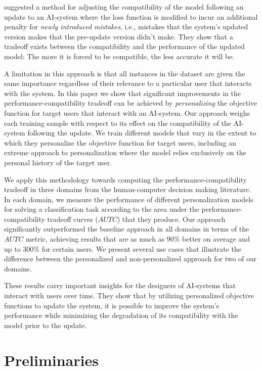 \documentclass[letterpaper]{article} %
\theoremstyle{definition}
\begin{document}
\citet{bansal2019updates} suggested a method for adjusting the compatibility of the model following an update to an AI-system  where the loss function is modified to incur an additional penalty for \textit{newly introduced mistakes}, i.e., mistakes that the system's updated version makes that the pre-update version didn't make. They show that a tradeoff exists between the compatibility and the performance of the updated model: The more it is forced to be compatible, the less accurate it will be.

A limitation in this approach is that all instances in the dataset are given the same importance regardless of their relevance to a particular user that interacts with the system.
In this paper we show that significant improvements in the performance-compatibility tradeoff can be achieved by \emph{personalizing} the objective function for   target users that interact with an AI-system. Our approach
weighs  each training sample with respect to its effect on the compatibility of the AI-system  following the update.
We  train different models that vary in the extent to which they personalize the  objective  function for
target users, including an extreme approach to personalization where the model relies exclusively on the personal history of the target user.

We apply this methodology towards computing the performance-compatibility tradeoff in  three domains from the human-computer decision making literature.
In each domain, we measure  the performance  of different personalization  models for  solving a classification  task according to  the area under the  performance-compatibility tradeoff curves ($AUTC$) that they produce.
Our  approach significantly outperformed the baseline approach \cite{bansal2019updates} in all domains in  terms of the $AUTC$ metric, achieving results that are as much as 90\% better on average and up to 300\% for certain users.
We  present several use cases that illustrate the difference between the personalized and non-personalized approach for two  of our domains.

These results carry important insights  for the designers of  AI-systems that interact with users over time. They  show that  by utilizing personalized objective functions to update the system, it is possible to improve the system's performance while minimizing the degradation of its compatibility with the model prior to the update.

\section{Preliminaries}
\label{sec:adjusting_comp}
\end{document}
